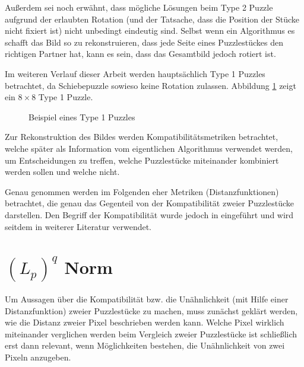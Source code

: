 \documentclass{whswinvcbook}
\begin{document}
Außerdem sei noch erwähnt, dass mögliche Lösungen beim Type 2 Puzzle aufgrund der erlaubten Rotation (und der Tatsache, dass die Position der Stücke nicht fixiert ist) nicht unbedingt eindeutig sind. Selbst wenn ein Algorithmus es schafft das Bild so zu rekonstruieren, dass jede Seite eines Puzzlestückes den richtigen Partner hat, kann es sein, dass das Gesamtbild jedoch rotiert ist.

Im weiteren Verlauf dieser Arbeit werden hauptsächlich Type 1 Puzzles betrachtet, da Schiebepuzzle sowieso keine Rotation zulassen. Abbildung \ref{fig-jigswap} zeigt ein $8\times 8$ Type 1 Puzzle.
\begin{figure}[H]
    \centering
    \quad\quad\quad\quad
    \caption{Beispiel eines Type 1 Puzzles}
    \label{fig-jigswap}
\end{figure}
Zur Rekonstruktion des Bildes werden Kompatibilitätsmetriken betrachtet, welche später als Information vom eigentlichen Algorithmus verwendet werden, um Entscheidungen zu treffen, welche Puzzlestücke miteinander kombiniert werden sollen und welche nicht.

Genau genommen werden im Folgenden eher Metriken (Distanzfunktionen) betrachtet, die genau das Gegenteil von der Kompatibilität zweier Puzzlestücke darstellen. Den Begriff der Kompatibilität wurde jedoch in \cite{pomeranz} eingeführt und wird seitdem in weiterer Literatur verwendet.
\section{$(L_p)^q$ Norm}\label{section-norm}
Um Aussagen über die Kompatibilität bzw. die Unähnlichkeit (mit Hilfe einer Distanzfunktion) zweier Puzzlestücke zu machen, muss zunächst geklärt werden, wie die Distanz zweier Pixel beschrieben werden kann. Welche Pixel wirklich miteinander verglichen werden beim Vergleich zweier Puzzlestücke ist schließlich erst dann relevant, wenn Möglichkeiten bestehen, die Unähnlichkeit von zwei Pixeln anzugeben.
\end{document}
